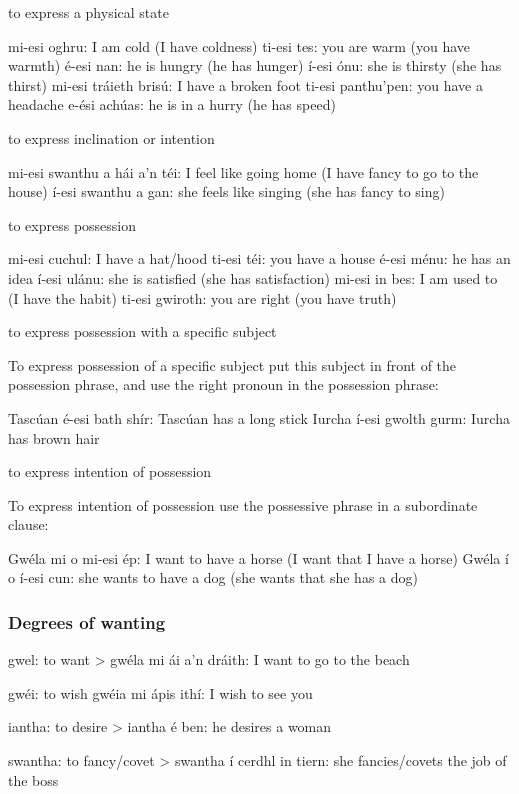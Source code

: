     to express a physical state

mi-esi oghru: I am cold (I have coldness)
ti-esi tes: you are warm (you have warmth)
\'{e}-esi nan: he is hungry (he has hunger)
\'{i}-esi \'{o}nu: she is thirsty (she has thirst)
mi-esi tr\'{a}ieth bris\'{u}: I have a broken foot
ti-esi panthu'pen: you have a headache
e-\'{e}si ach\'{u}as: he is in a hurry (he has speed)

    to express inclination or intention

mi-esi swanthu a h\'{a}i a'n t\'{e}i: I feel like going home (I have fancy to go to the house)
\'{i}-esi swanthu a gan: she feels like singing (she has fancy to sing)

    to express possession

mi-esi cuchul: I have a hat/hood
ti-esi t\'{e}i: you have a house
\'{e}-esi m\'{e}nu: he has an idea
\'{i}-esi ul\'{a}nu: she is satisfied (she has satisfaction)
mi-esi in bes: I am used to (I have the habit)
ti-esi gwiroth: you are right (you have truth)

    to express possession with a specific subject

To express possession of a specific subject put this subject in front of the possession phrase, and use the right pronoun in the possession phrase:

Tasc\'{u}an \'{e}-esi bath sh\'{i}r: Tasc\'{u}an has a long stick
Iurcha \'{i}-esi gwolth gurm: Iurcha has brown hair

    to express intention of possession

To express intention of possession use the possessive phrase in a subordinate clause:

Gw\'{e}la mi o mi-esi \'{e}p: I want to have a horse (I want that I have a horse)
Gw\'{e}la \'{i} o \'{i}-esi cun: she wants to have a dog (she wants that she has a dog)

\subsubsection{Degrees of wanting}

gwel: to want
> gw\'{e}la mi \'{a}i a'n dr\'{a}ith: I want to go to the beach

gw\'{e}i: to wish
gw\'{e}ia mi \'{a}pis ith\'{i}: I wish to see you

iantha: to desire
> iantha \'{e} ben: he desires a woman

swantha: to fancy/covet
> swantha \'{i} cerdhl in tiern: she fancies/covets the job of the boss

